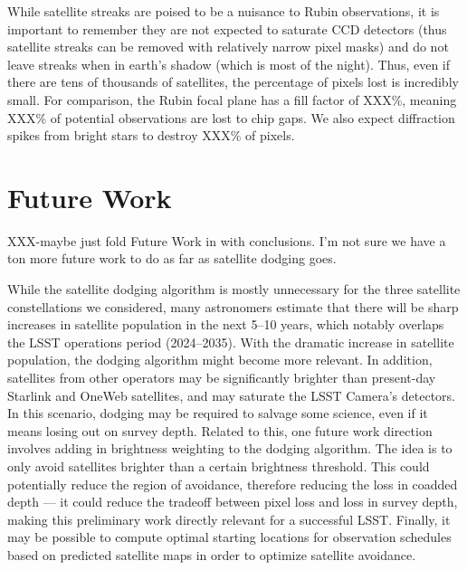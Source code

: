 \documentclass[linenumbers]{aastex631}
\begin{document}
While satellite streaks are poised to be a nuisance to Rubin observations, it is important to remember they are not expected to saturate CCD detectors (thus satellite streaks can be removed with relatively narrow pixel masks) and do not leave streaks when in earth's shadow (which is most of the night). Thus, even if there are tens of thousands of satellites, the percentage of pixels lost is incredibly small. For comparison, the Rubin focal plane has a fill factor of XXX\%, meaning XXX\% of potential observations are lost to chip gaps. We also expect diffraction spikes from bright stars to destroy XXX\% of pixels. 

\section{Future Work}\label{future}

XXX-maybe just fold Future Work in with conclusions. I'm not sure we have a ton more future work to do as far as satellite dodging goes.

While the satellite dodging algorithm is mostly unnecessary for the three satellite constellations we considered, many astronomers estimate that there will be sharp increases in satellite population in the next 5–10 years, which notably overlaps the LSST operations period (2024–2035). With the dramatic increase in satellite population, the dodging algorithm might become more relevant. In addition, satellites from other operators may be significantly brighter than present-day Starlink and OneWeb satellites, and may saturate the LSST Camera’s detectors. In this scenario, dodging may be required to salvage some science, even if it means losing out on survey depth. Related to this, one future work direction involves adding in brightness weighting to the dodging algorithm. The idea is to only avoid satellites brighter than a certain brightness threshold. This could potentially reduce the region of avoidance, therefore reducing the loss in coadded depth — it could reduce the tradeoff between pixel loss and loss in survey depth, making this preliminary work directly relevant for a successful LSST. Finally, it may be possible to compute optimal starting locations for observation schedules based on predicted satellite maps in order to optimize satellite avoidance.






{}

\end{document}
